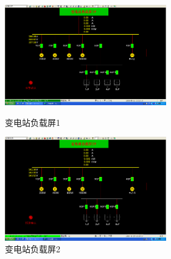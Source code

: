 \documentclass[a4paper]{ctexrep}
\begin{document}
                    \begin{figure}[htbp]
                        \centering
                        \begin{minipage}[t]{0.48\textwidth}
                            \centering
                            \includegraphics[width=7cm]{11.png}
                            \caption{变电站负载屏1}
                        \end{minipage} 
                        \begin{minipage}[t]{0.48\textwidth}
                            \centering
                            \includegraphics[width=7cm]{12.png}
                            \caption{变电站负载屏2}
                        \end{minipage}
                    \end{figure}
\end{document}
